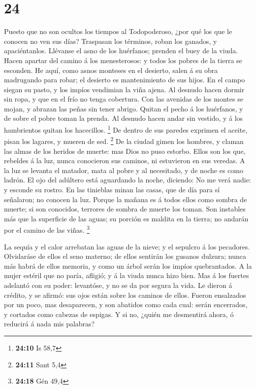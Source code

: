 \hypertarget{section-23}{%
\section{24}\label{section-23}}

 Puesto que no son ocultos los tiempos al Todopoderoso, ¿por
qué los que le conocen no ven sus días?  Traspasan los
términos, roban los ganados, y apaciéntanlos.  Llévanse el
asno de los huérfanos; prenden el buey de la viuda.  Hacen
apartar del camino á los menesterosos: y todos los pobres de la tierra
se esconden.  He aquí, como asnos monteses en el desierto,
salen á su obra madrugando para robar; el desierto es mantenimiento de
sus hijos.  En el campo siegan su pasto, y los impíos
vendimian la viña ajena.  Al desnudo hacen dormir sin ropa,
y que en el frío no tenga cobertura.  Con las avenidas de
los montes se mojan, y abrazan las peñas sin tener abrigo. 
Quitan el pecho á los huérfanos, y de sobre el pobre toman la prenda.
 Al desnudo hacen andar sin vestido, y á los hambrientos
quitan los hacecillos. \footnote{\textbf{24:10} Is 58,7} 
De dentro de sus paredes exprimen el aceite, pisan los lagares, y mueren
de sed. \footnote{\textbf{24:11} Sant 5,4}  De la ciudad
gimen los hombres, y claman las almas de los heridos de muerte: mas Dios
no puso estorbo.  Ellos son los que, rebeldes á la luz,
nunca conocieron sus caminos, ni estuvieron en sus veredas.
 A la luz se levanta el matador, mata al pobre y al
necesitado, y de noche es como ladrón.  El ojo del adúltero
está aguardando la noche, diciendo: No me verá nadie: y esconde su
rostro.  En las tinieblas minan las casas, que de día para
sí señalaron; no conocen la luz.  Porque la mañana es á
todos ellos como sombra de muerte; si son conocidos, terrores de sombra
de muerte los toman.  Son instables más que la superficie
de las aguas; su porción es maldita en la tierra; no andarán por el
camino de las viñas. \footnote{\textbf{24:18} Gén 49,4}

 La sequía y el calor arrebatan las aguas de la nieve; y el
sepulcro á los pecadores.  Olvidaráse de ellos el seno
materno; de ellos sentirán los gusanos dulzura; nunca más habrá de ellos
memoria, y como un árbol serán los impíos quebrantados.  A
la mujer estéril que no paría, afligió; y á la viuda nunca hizo bien.
 Mas á los fuertes adelantó con su poder: levantóse, y no
se da por segura la vida.  Le dieron á crédito, y se
afirmó: sus ojos están sobre los caminos de ellos.  Fueron
ensalzados por un poco, mas desaparecen, y son abatidos como cada cual:
serán encerrados, y cortados como cabezas de espigas.  Y si
no, ¿quién me desmentirá ahora, ó reducirá á nada mis palabras?

